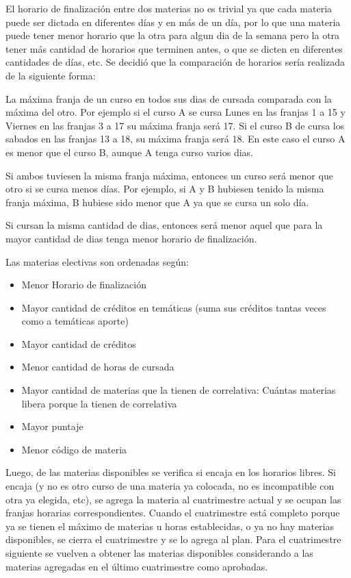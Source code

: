 \documentclass[a4paper]{article}
\begin{document}
El horario de finalización entre dos materias no es trivial ya que cada materia puede ser dictada en diferentes días y en más de un día, por lo que una materia puede tener menor horario que la otra para algun dia de la semana pero la otra tener más cantidad de horarios que terminen antes, o que se dicten en diferentes cantidades de días, etc. Se decidió que la comparación de horarios sería realizada de la siguiente forma:\newline

La máxima franja de un curso en todos sus dias de cursada comparada con la máxima del otro. Por ejemplo si el curso A se cursa Lunes en las franjas 1 a 15 y Viernes en las franjas 3 a 17 su máxima franja será 17. Si el curso B de cursa los sabados en las franjas 13 a 18, su máxima franja será 18. En este caso el curso A es menor que el curso B, aunque A tenga curso varios dias.

Si ambos tuviesen la misma franja máxima, entonces un curso será menor que otro si se cursa menos días. Por ejemplo, si A y B hubiesen tenido la misma franja máxima, B hubiese sido menor que A ya que se cursa un solo día.

Si cursan la misma cantidad de dias, entonces será menor aquel que para la mayor cantidad de dias tenga menor horario de finalización.\newline

Las materias electivas son ordenadas según:

\begin{itemize}
	\item Menor Horario de finalización
	\item Mayor cantidad de créditos en temáticas (suma sus créditos tantas veces como a temáticas aporte)
	\item Mayor cantidad de créditos
	\item Menor cantidad de horas de cursada
    \item Mayor cantidad de materias que la tienen de correlativa: Cuántas materias libera porque la tienen de correlativa
	\item Mayor puntaje
	\item Menor código de materia
\end{itemize}

Luego, de las materias disponibles se verifica si encaja en los horarios libres. Si encaja (y no es otro curso de una materia ya colocada, no es incompatible con otra ya elegida, etc), se agrega la materia al cuatrimestre actual y se ocupan las franjas horarias correspondientes. Cuando el cuatrimestre está completo porque ya se tienen el máximo de materias u horas establecidas, o ya no hay materias disponibles, se cierra el cuatrimestre y se lo agrega al plan. Para el cuatrimestre siguiente se vuelven a obtener las materias disponibles considerando a las materias agregadas en el último cuatrimestre como aprobadas.
\end{document}
